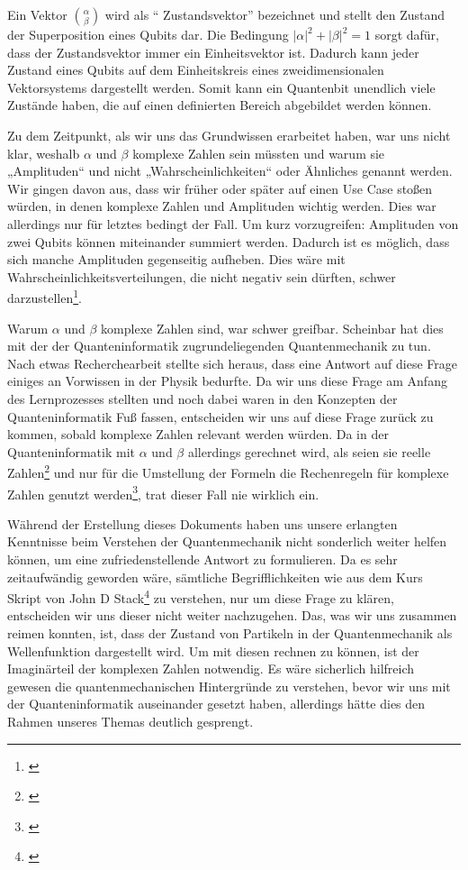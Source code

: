 Ein Vektor $\binom{\alpha}{\beta}$ wird als ``
Zustandsvektor'' bezeichnet und stellt den Zustand der Superposition eines Qubits dar. Die Bedingung $\left|\alpha\right|^2+\left|\beta\right|^2=1$ sorgt dafür, dass der Zustandsvektor immer ein Einheitsvektor ist. Dadurch kann jeder Zustand eines Qubits auf dem Einheitskreis eines zweidimensionalen Vektorsystems dargestellt werden. Somit kann ein Quantenbit unendlich viele Zustände haben, die auf einen definierten Bereich abgebildet werden können. 

\begin{tcolorbox}[title=Kommentar,
    title filled=false,
    colback=cyan!5!white,
    colframe=cyan!75!black]
Zu dem Zeitpunkt, als wir uns das Grundwissen erarbeitet haben, war uns nicht klar, weshalb $\alpha$ und $\beta$ komplexe Zahlen sein müssten und warum sie „Amplituden“ und nicht „Wahrscheinlichkeiten“ oder Ähnliches genannt werden. Wir gingen davon aus, dass wir früher oder später auf einen Use Case stoßen würden, in denen komplexe Zahlen und Amplituden wichtig werden. Dies war allerdings nur für letztes bedingt der Fall. Um kurz vorzugreifen: Amplituden von zwei Qubits können miteinander summiert werden. Dadurch ist es möglich, dass sich manche Amplituden gegenseitig aufheben. Dies wäre mit Wahrscheinlichkeitsverteilungen, die nicht negativ sein dürften, schwer darzustellen\footnote{\cite{homeister_quantum_2022}}.

Warum $\alpha$ und $\beta$ komplexe Zahlen sind, war schwer greifbar. Scheinbar hat dies mit der der Quanteninformatik zugrundeliegenden Quantenmechanik zu tun. Nach etwas Recherchearbeit stellte sich heraus, dass eine Antwort auf diese Frage einiges an Vorwissen in der Physik bedurfte. Da wir uns diese Frage am Anfang des Lernprozesses stellten und noch dabei waren in den Konzepten der Quanteninformatik Fuß fassen, entscheiden wir uns auf diese Frage zurück zu kommen, sobald komplexe Zahlen relevant werden würden. Da in der Quanteninformatik mit $\alpha$ und $\beta$ allerdings gerechnet wird, als seien sie reelle Zahlen\footnote{\cite{why_complex_numbers}} und nur für die Umstellung der Formeln die Rechenregeln für komplexe Zahlen genutzt werden\footnote{\cite{homeister_quantum_2022}}, trat dieser Fall nie wirklich ein.

Während der Erstellung dieses Dokuments haben uns unsere erlangten Kenntnisse beim Verstehen der Quantenmechanik nicht sonderlich weiter helfen können, um eine zufriedenstellende Antwort zu formulieren. Da es sehr zeitaufwändig geworden wäre, sämtliche Begrifflichkeiten wie aus dem Kurs Skript von John D Stack\footnote{\cite{Stack_complex_2013}} zu verstehen, nur um diese Frage zu klären, entscheiden wir uns dieser nicht weiter nachzugehen. Das, was wir uns zusammen reimen konnten, ist, dass der Zustand von Partikeln in der Quantenmechanik als Wellenfunktion dargestellt wird. Um mit diesen rechnen zu können, ist der Imaginärteil der komplexen Zahlen notwendig. Es wäre sicherlich hilfreich gewesen die quantenmechanischen Hintergründe zu verstehen, bevor wir uns mit der Quanteninformatik auseinander gesetzt haben, allerdings hätte dies den Rahmen unseres Themas deutlich gesprengt.
\end{tcolorbox}

